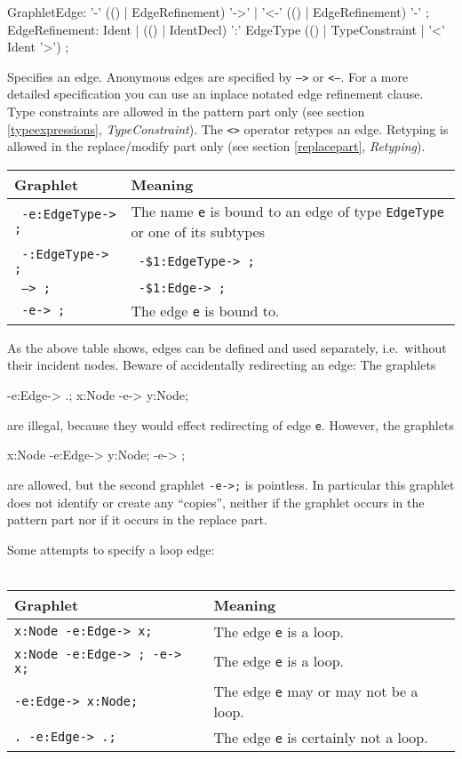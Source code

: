 \begin{rail}
  GraphletEdge: '-' (() | EdgeRefinement) '->'  | '<-' (() | EdgeRefinement) '-' ;
  EdgeRefinement: Ident | (() | IdentDecl) ':' EdgeType (() | TypeConstraint | '<' Ident '>') ;
\end{rail}
Specifies an edge. Anonymous edges are specified by \texttt{-->} or \texttt{<--}. For a more detailed specification you can use an inplace notated edge refinement clause. Type constraints are allowed in the pattern part only (see section \ref{typeexpressions}, \emph{TypeConstraint}). The \texttt{<>} operator retypes an edge. Retyping is allowed in the replace/modify part only (see section \ref{replacepart}, \emph{Retyping}).\\
\begin{center}
  \begin{tabular}[c]{ll}
    \textbf{Graphlet} & \textbf{Meaning}\\ \hline
    \texttt{ -e:EdgeType-> ;} & The name \texttt{e} is bound to an edge of type \texttt{EdgeType} or one of its subtypes  \\
    \texttt{ -:EdgeType-> ;} & \texttt{ -\$1:EdgeType-> ;} \\
    \texttt{ --> ;} & \texttt{ -\$1:Edge-> ;} \\
    \texttt{ -e-> ;} & The edge \texttt{e} is bound to.
  \end{tabular}
\end{center} 
As the above table shows, edges can be defined and used separately, i.e.\ without their incident nodes. Beware of accidentally redirecting an edge: 
The graphlets
\begin{grgenlet}
-e:Edge-> .;
x:Node -e-> y:Node;
\end{grgenlet}
are illegal, because they would effect redirecting of edge \texttt{e}. 
However, the graphlets
\begin{grgenlet}
x:Node -e:Edge-> y:Node;
 -e-> ;
\end{grgenlet}
are allowed, but the second graphlet \texttt{-e->;} is pointless. In particular this graphlet does not identify or create any ``copies'', neither if the graphlet occurs in the pattern part nor if it occurs in the replace part.
\begin{example}
Some attempts to specify a loop edge:\\
\mbox{ }\\
\begin{tabular}[c]{ll} 
 \textbf{Graphlet} & \textbf{Meaning} \\ \hline
 \texttt{x:Node -e:Edge-> x;} & The edge \texttt{e} is a loop.\\ 
 \texttt{x:Node -e:Edge-> ; -e-> x;} & The edge \texttt{e} is a loop.\\ 
 \texttt{-e:Edge-> x:Node;} & The edge \texttt{e} may or may not be a loop.\\ 
 \texttt{.\ -e:Edge-> .;} & The edge \texttt{e} is certainly not a loop.\\ 
\end{tabular}
\end{example}

